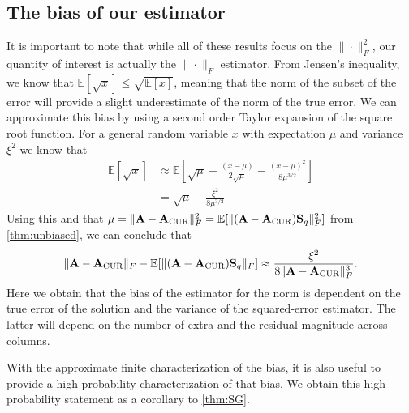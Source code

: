 \documentclass[11pt]{article}
\newcommand{\curX}{\mathbf{A}_{\textup{CUR}}}
\begin{document}
\subsection{The bias of our estimator}
It is important to note that while all of these results focus on the $\|\cdot\|_F^2$, our quantity of interest is actually the $\|\cdot\|_F$ estimator. From Jensen's inequality, we know that $  \mathbb{E}[\sqrt x] \leq \sqrt{\mathbb{E}[x]}$, meaning that the norm of the subset of the error will provide a slight underestimate of the norm of the true error. We can approximate this bias by using a second order Taylor expansion of the square root function. For a general random variable $x$ with expectation $\mu$ and variance $\xi^2$ we know that
\begin{align}
    \mathbb{E}[\sqrt{x}] & \approx \mathbb{E}\left[\sqrt{\mu} + \frac{(x - \mu)}{2 \sqrt{\mu}} - \frac{(x - \mu)^2}{8 \mu^{3/2}}\right] \\
                         & = \sqrt{\mu} - \frac{\xi^2}{8 \mu^{3/2}}
\end{align}
Using this and that $\mu = \|\mathbf{A} - \curX\|_F^2 = \mathbb{E}[\|(\mathbf{A} - \curX)\mathbf{S}_q\|_F^2]$ from \cref{thm:unbiased}, we can conclude that
\begin{equation}
    \|\mathbf{A} - \curX\|_F - \mathbb{E}[\|(\mathbf{A} - \curX)\mathbf{S}_q\|_F] \approx \frac{\xi^2 }{8\|\mathbf{A} - \curX\|_F^3}.
\end{equation}
Here we obtain that the bias of the estimator for the norm is dependent on the true error of the solution and the variance of the squared-error estimator. The latter will depend on the number of extra and the residual magnitude across columns.

With the approximate finite characterization of the bias, it is also useful to provide a high probability characterization of that bias. We obtain this high probability statement as a corollary to \cref{thm:SG}.
\end{document}
